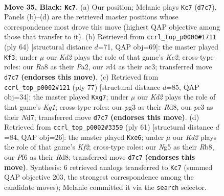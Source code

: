 \documentclass[11pt]{article}
\begin{document}
\clearpage

\begin{figure}[p]\centering
\begin{subfigure}{0.46\textwidth}\centering
\resizebox{\linewidth}{!}{%
\newchessgame
\chessboard[
  setfen={r2n2Q1/1p1k2p1/p4pN1/6np/3R4/4P1P1/PP2RPBP/6K1 b - - 0 35},
  showmover=false,
  pgfstyle=straightmove, color=movearrow, markmove={d7-c7}
]}
\caption{}
\end{subfigure}\hfill
\begin{subfigure}{0.46\textwidth}\centering
\resizebox{\linewidth}{!}{%
\newchessgame
\chessboard[
  setfen={5k2/p3pp2/1p2r1p1/7p/1PPR1P2/2n1N1P1/P3K2P/8 w - - 7 33},
  showmover=false,
  pgfstyle=straightmove, color=movearrow, markmove={e2-f3}
]}
\caption{}
\end{subfigure}
\\[4pt]
\begin{subfigure}{0.46\textwidth}\centering
\resizebox{\linewidth}{!}{%
\newchessgame
\chessboard[
  setfen={3r2k1/p2n1pQp/1p1P4/5p1p/2B2P2/P3R1P1/1P4K1/8 b - - 0 39},
  showmover=false,
  pgfstyle=straightmove, color=movearrow, markmove={g8-g7}
]}
\caption{}
\end{subfigure}\hfill
\begin{subfigure}{0.46\textwidth}\centering
\resizebox{\linewidth}{!}{%
\newchessgame
\chessboard[
  setfen={1r1r4/1p3kp1/pn2Pp2/1n5p/1B5P/4PNP1/1PR2PK1/3R4 b - - 0 31},
  showmover=false,
  pgfstyle=straightmove, color=movearrow, markmove={f7-e6}
]}
\caption{}
\end{subfigure}
\caption{\textbf{Move 35, Black: \texttt{Kc7}.} (a) Our position; Melanie plays \texttt{Kc7} (\texttt{d7c7}). Panels (b)--(d) are the retrieved master positions whose correspondence most drove this move (highest QAP objective among those that transfer to it). (b) Retrieved from \texttt{ccrl\_top\_p0000\#1711} (ply 64) [structural distance $d$=71, QAP obj=69]: the master played \texttt{Kf3}; under $\mu$ our \emph{Kd2} plays the role of that game's \emph{Ke2}; cross-type roles: our \emph{R}a8 as their \emph{P}a2, our \emph{r}d4 as their \emph{n}c3; transferred move \texttt{d7c7} \textbf{(endorses this move)}. (c) Retrieved from \texttt{ccrl\_top\_p0002\#121} (ply 77) [structural distance $d$=85, QAP obj=34]: the master played \texttt{Kxg7}; under $\mu$ our \emph{Kd2} plays the role of that game's \emph{Kg1}; cross-type roles: our \emph{p}g3 as their \emph{R}d8, our \emph{p}e3 as their \emph{N}d7; transferred move \texttt{d7c7} \textbf{(endorses this move)}. (d) Retrieved from \texttt{ccrl\_top\_p0002\#3359} (ply 61) [structural distance $d$=84, QAP obj=26]: the master played \texttt{Kxe6}; under $\mu$ our \emph{Kd2} plays the role of that game's \emph{Kf2}; cross-type roles: our \emph{N}g5 as their \emph{R}b8, our \emph{P}f6 as their \emph{R}d8; transferred move \texttt{d7c7} \textbf{(endorses this move)}. Synthesis: 6 retrieved analogs transferred to \texttt{Kc7} (summed QAP objective 203, the strongest correspondence among the candidate moves); Melanie committed it via the \texttt{search} selector.}
\label{fig:thought-m69}
\end{figure}
\end{document}
